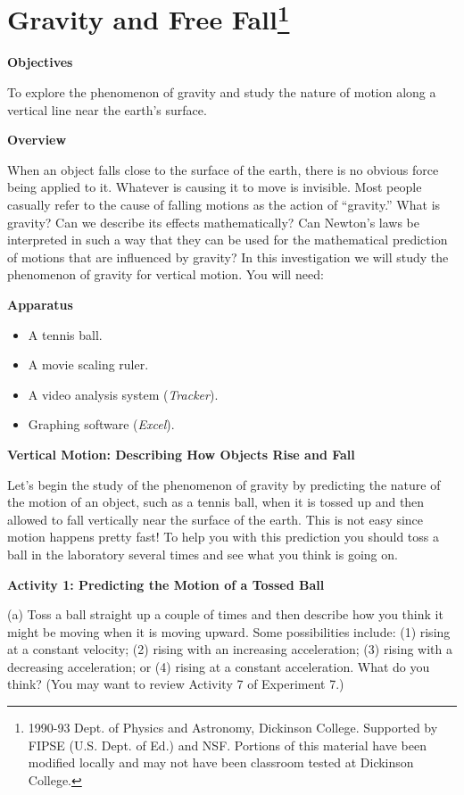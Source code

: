 
\section{Gravity and Free Fall\footnote{
1990-93 Dept. of Physics and Astronomy, Dickinson College. Supported by FIPSE
(U.S. Dept. of Ed.) and NSF. Portions of this material have been modified locally
and may not have been classroom tested at Dickinson College.
}}

\makelabheader %

\textbf{Objectives }

To explore the phenomenon of gravity and study the nature of motion along a
vertical line near the earth's surface.

\textbf{Overview }

When an object falls close to the surface of the earth, there is no obvious
force being applied to it. Whatever is causing it to move is invisible. Most
people casually refer to the cause of falling motions as the action of 
``gravity.''
What is gravity? Can we describe its effects mathematically? Can Newton's laws
be interpreted in such a way that they can be used for the mathematical prediction
of motions that are influenced by gravity? In this investigation we will study
the phenomenon of gravity for vertical motion. You will need:

\textbf{Apparatus}

\begin{itemize}
\item A tennis ball. 
\item A movie scaling ruler.
\item A video analysis system (\textit{Tracker}). 
\item Graphing software (\textit{Excel}).
\end{itemize}
\textbf{Vertical Motion: Describing How Objects Rise and Fall }

Let's begin the study of the phenomenon of gravity by predicting the nature
of the motion of an object, such as a tennis ball, when it is tossed up and
then allowed to fall vertically near the surface of the earth. This is not easy
since motion happens pretty fast! To help you with this prediction you should
toss a ball in the laboratory several times and see what you think is going
on.

\textbf{Activity 1: Predicting the Motion of a Tossed Ball }

(a) Toss a ball straight up a couple of times and then describe how you think
it might be moving when it is moving upward. Some possibilities include: (1)
rising at a constant velocity; (2) rising with an increasing acceleration; (3)
rising with a decreasing acceleration; or (4) rising at a constant acceleration. What do you think? (You may want to review Activity 7 of Experiment 7.)
\vspace{20mm}


